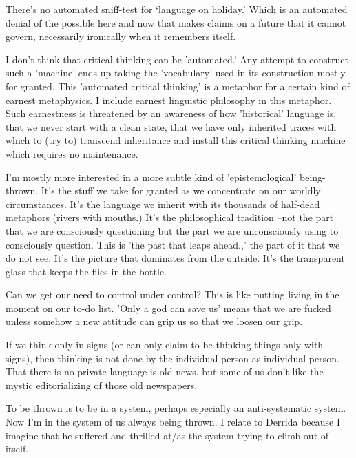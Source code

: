 \documentclass{article}
\begin{document}
There's no automated sniff-test for `language on holiday.' Which is an automated denial of the possible here and now that makes claims on a future that it cannot govern, necessarily ironically when it remembers itself.
\newline

I don't think that critical thinking can be 'automated.' Any attempt to construct such a 'machine' ends up taking the 'vocabulary' used in its construction mostly for granted. This 'automated critical thinking' is a metaphor for a certain kind of earnest metaphysics. I include earnest linguistic philosophy in this metaphor. Such earnestness is threatened by an awareness of how 'historical' language is, that we never start with a clean state, that we have only inherited traces with which to (try to) transcend inheritance and install this critical thinking machine which requires no maintenance.
\newline

I'm mostly more interested in a more subtle kind of 'epistemological' being-thrown. It's the stuff we take for granted as we concentrate on our worldly circumstances. It's the language we inherit with its thousands of half-dead metaphors (rivers with mouths.) It's the philosophical tradition --not the part that we are consciously questioning but the part we are unconsciously using to consciously question. This is 'the past that leaps ahead.,' the part of it that we do not see. It's the picture that dominates from the outside. It's the transparent glass that keeps the flies in the bottle.
\newline

Can we get our need to control under control? This is like putting living in the moment on our to-do list. 'Only a god can save us' means that we are fucked unless somehow a new attitude can grip us so that we loosen our grip.
\newline

If we think only in signs (or can only claim to be thinking things only with signs), then thinking is not done by the individual person as individual person. That there is no private language is old news, but some of us don't like the mystic editorializing of those old newspapers.
\newline

To be thrown is to be in a system, perhaps especially an anti-systematic system. Now I'm in the system of us always being thrown. I relate to Derrida because I imagine that he suffered and thrilled at/as the system trying to climb out of itself.
\newline
\end{document}
